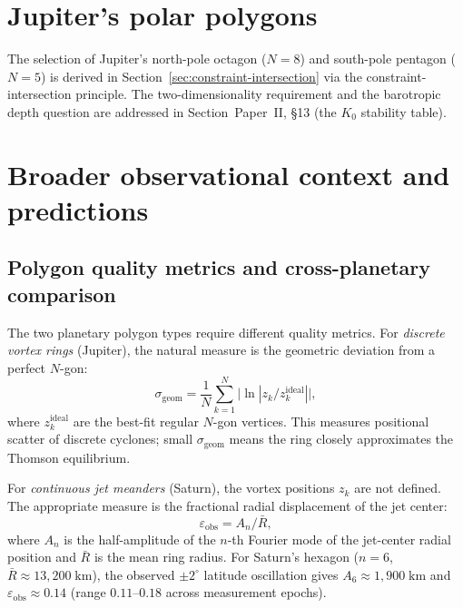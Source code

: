 \section{Jupiter's polar polygons}
\label{sec:jupiter}

The selection of Jupiter's north-pole octagon ($N = 8$) and
south-pole pentagon ($N = 5$) is derived in
Section~\ref{sec:constraint-intersection} via the
constraint-intersection principle.  The two-dimensionality
requirement and the barotropic depth question are addressed in
Section~Paper~II, \S13 (the $K_0$ stability table).

\section{Broader observational context and predictions}
\label{sec:observations}
\label{sec:planets}

\subsection{Polygon quality metrics and cross-planetary comparison}

The two planetary polygon types require different quality metrics.
For \emph{discrete vortex rings} (Jupiter), the natural measure is the
geometric deviation from a perfect $N$-gon:
\begin{equation}\label{eq:sigma-geom}
  \sigma_{\mathrm{geom}} = \frac{1}{N}\sum_{k=1}^{N}
  \bigl|\!\ln|z_k / z_k^{\mathrm{ideal}}|\bigr|,
\end{equation}
where $z_k^{\mathrm{ideal}}$ are the best-fit regular $N$-gon vertices.
This measures positional scatter of discrete cyclones; small
$\sigma_{\mathrm{geom}}$ means the ring closely approximates the
Thomson equilibrium.

For \emph{continuous jet meanders} (Saturn), the vortex positions $z_k$
are not defined.  The appropriate measure is the fractional radial
displacement of the jet center:
\begin{equation}\label{eq:eps-obs}
  \varepsilon_{\mathrm{obs}} = A_n / \bar{R},
\end{equation}
where $A_n$ is the half-amplitude of the $n$-th Fourier mode of the
jet-center radial position and $\bar{R}$ is the mean ring radius.
For Saturn's hexagon ($n = 6$, $\bar{R} \approx 13{,}200\;\mathrm{km}$),
the observed $\pm 2^\circ$ latitude oscillation
\citep{Godfrey1988, Antunano2015} gives
$A_6 \approx 1{,}900\;\mathrm{km}$ and
$\varepsilon_{\mathrm{obs}} \approx 0.14$ (range $0.11$--$0.18$ across
measurement epochs).

